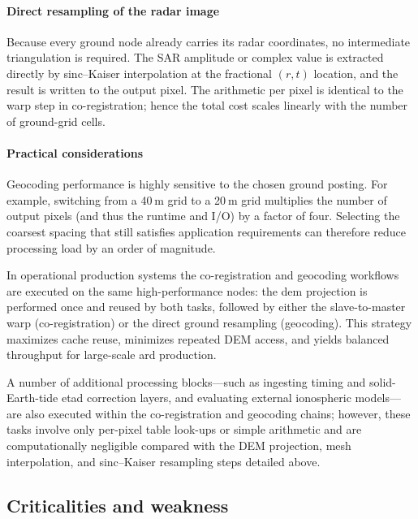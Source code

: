 \paragraph{Direct resampling of the radar image}  
Because every ground node already carries its radar coordinates, no intermediate triangulation is required.  The SAR amplitude or complex value is extracted directly by sinc–Kaiser interpolation at the fractional \((r,t)\) location, and the result is written to the output pixel.  The arithmetic per pixel is identical to the warp step in co-registration; hence the total cost scales linearly with the number of ground-grid cells.

\paragraph{Practical considerations}  
Geocoding performance is highly sensitive to the chosen ground posting. For example, switching from a 40 m grid to a 20 m grid multiplies the number of output pixels (and thus the runtime and I/O) by a factor of four.  Selecting the coarsest spacing that still satisfies application requirements can therefore reduce processing load by an order of magnitude.

\vspace{0.5em}

\noindent
In operational production systems the co-registration and geocoding workflows are executed on the same high-performance nodes: the \acs{dem} projection is performed once and reused by both tasks, followed by either the slave-to-master warp (co-registration) or the direct ground resampling (geocoding).  This strategy maximizes cache reuse, minimizes repeated DEM access, and yields balanced throughput for large-scale \acs{ard} production.

\noindent%
A number of additional processing blocks—such as ingesting timing and solid-Earth-tide \acs{etad} correction layers, and evaluating external ionospheric models—are also executed within the co-registration and geocoding chains; however, these tasks involve only per-pixel table look-ups or simple arithmetic and are computationally negligible compared with the DEM projection, mesh interpolation, and sinc–Kaiser resampling steps detailed above.

\subsection{Criticalities and weakness}
\label{sec:cslc_criticalities}

